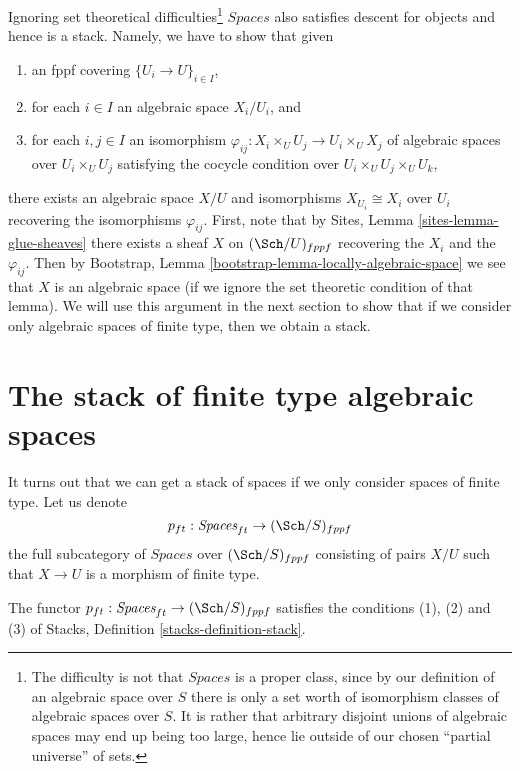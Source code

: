 \begin{remark}
\label{remark-stack-spaces}
Ignoring set theoretical difficulties\footnote{The difficulty is not
that $\textit{Spaces}$ is a proper class, since by our definition of
an algebraic space over $S$ there is only a set worth of isomorphism
classes of algebraic spaces over $S$. It is rather that arbitrary disjoint
unions of algebraic spaces may end up being too large, hence lie outside
of our chosen ``partial universe'' of sets.}
$\textit{Spaces}$ also satisfies
descent for objects and hence is a stack. Namely, we have to show that
given
\begin{enumerate}
\item an fppf covering $\{U_i \to U\}_{i \in I}$,
\item for each $i \in I$ an algebraic space $X_i/U_i$, and
\item for each $i, j \in I$ an isomorphism
$\varphi_{ij} : X_i \times_U U_j \to U_i \times_U X_j$ of algebraic spaces
over $U_i \times_U U_j$ satisfying the cocycle condition over
$U_i \times_U U_j \times_U U_k$,
\end{enumerate}
there exists an algebraic space $X/U$ and isomorphisms
$X_{U_i} \cong X_i$ over $U_i$ recovering the isomorphisms $\varphi_{ij}$.
First, note that by
Sites, Lemma \ref{sites-lemma-glue-sheaves}
there exists a sheaf $X$ on $(\Sch/U)_{fppf}$ recovering
the $X_i$ and the $\varphi_{ij}$. Then by
Bootstrap, Lemma \ref{bootstrap-lemma-locally-algebraic-space}
we see that $X$ is an algebraic space (if we ignore the set theoretic
condition of that lemma).
We will use this argument in the next section to show that
if we consider only algebraic spaces of finite type, then we obtain
a stack.
\end{remark}






\section{The stack of finite type algebraic spaces}
\label{section-stack-of-finite-type-spaces}


\noindent
It turns out that we can get a stack of spaces
if we only consider spaces of finite type.
Let us denote
$$
p_{ft} : \textit{Spaces}_{ft} \to (\Sch/S)_{fppf}
$$
the full subcategory of $\textit{Spaces}$ over $(\Sch/S)_{fppf}$
consisting of pairs $X/U$ such that $X \to U$
is a morphism of finite type.

\begin{lemma}
\label{lemma-stack-of-finite-type-spaces}
The functor
$p_{ft} : \textit{Spaces}_{ft} \to (\Sch/S)_{fppf}$
satisfies the conditions (1), (2) and (3) of
Stacks, Definition \ref{stacks-definition-stack}.
\end{lemma}

